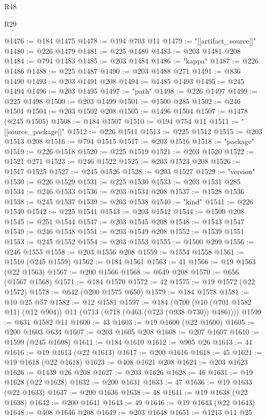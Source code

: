 \begin{lexlean}{R48}
\begin{lexlean}{R29}
\begin{coremodule}
{{{{{{{{{{{{{{{{{{{{{{{{{{{{{{{{{{{{{{{{{{{{{{{{{{{{{{{{{{{{{{{{{{{{{{{{{{{{{{{{{{{{{{{{{{{{{{{{{{{{{{{{{{{{{{{{{{{{{{{{{{{{{{{{{{{{{{{{{{{{{{{{{{{{{{{{{{{{{{{{{{{{{{{{{{{{{{{{{{{{{{{{{{{{{{{{{{{{{{{{{{{{{{{{{{{{{{{{{{@1476 := @184 @1475
@1478 := @194 @703 @11
@1479 := "[[artifact_source]]"
@1480 := @226 @1479
@1481 := @225 @1480
@1483 := @203 @1481 @208
@1484 := @794 @1483
@1485 := @203 @1484
@1486 := "kappa"
@1487 := @226 @1486
@1488 := @225 @1487
@1490 := @203 @1488 @271
@1491 := @836 @1490
@1493 := @203 @1491 @208
@1494 := @1485 @1493
@1495 := @245 @1494
@1496 := @203 @1495
@1497 := "path"
@1498 := @226 @1497
@1499 := @225 @1498
@1500 := @203 @1499
@1501 := @1500 @285
@1502 := @246 @1501
@1504 := @203 @1502 @208
@1505 := @1496 @1504
@1507 := @1478 (@245 @1505)
@1508 := @184 @1507
@1510 := @194 @754 @11
@1511 := "[[source_package]]"
@1512 := @226 @1511
@1513 := @225 @1512
@1515 := @203 @1513 @208
@1516 := @794 @1515
@1517 := @203 @1516
@1518 := "package"
@1519 := @226 @1518
@1520 := @225 @1519
@1521 := @203 @1520
@1522 := @1521 @271
@1523 := @246 @1522
@1525 := @203 @1523 @208
@1526 := @1517 @1525
@1527 := @245 @1526
@1528 := @203 @1527
@1529 := "version"
@1530 := @226 @1529
@1531 := @225 @1530
@1533 := @203 @1531 @285
@1534 := @246 @1533
@1536 := @203 @1534 @208
@1537 := @1528 @1536
@1538 := @245 @1537
@1539 := @203 @1538
@1540 := "kind"
@1541 := @226 @1540
@1542 := @225 @1541
@1543 := @203 @1542
@1544 := @1500 @208
@1545 := @251 @1544
@1547 := @203 @1545 @208
@1548 := @1543 @1547
@1549 := @246 @1548
@1551 := @203 @1549 @208
@1552 := @1539 @1551
@1553 := @245 @1552
@1554 := @203 @1553
@1555 := @1500 @299
@1556 := @246 @1555
@1558 := @203 @1556 @208
@1559 := @1554 @1558
@1561 := @1510 (@245 @1559)
@1562 := @184 @1561
@1563 := 41
@1566 := @19 @1563 (@22 @1563)
@1567 := @200 @1566
@1568 := @649 @208
@1570 := @656 (@1567 @1568)
@1571 := @184 @1570
@1572 := 42
@1575 := @19 @1572 (@22 @1572)
@1578 := @642 (@200 @1575 @650)
@1579 := @184 @1578
@1581 := @10 @25 @57
@1582 := @12 @1581
@1597 := @184
    (@700 (@10 (@701 @1582 @11) (@12 @904)) @11 (@713 (@718 (@463 (@723 (@938 @730)) @486))))
@1599 := @631 @1582 @11
@1600 := 43
@1603 := @19 @1600 (@22 @1600)
@1605 := @200 @1603 @634
@1607 := @203 @1605 @208
@1608 := @207 @1607
@1610 := @1599 (@245 @1608)
@1611 := @184 @1610
@1612 := @905 @26
@1613 := 44
@1616 := @19 @1613 (@22 @1613)
@1617 := @200 @1616
@1618 := 45
@1621 := @19 @1618 (@22 @1618)
@1623 := @408 @1621 @208
@1624 := @203 @1623
@1626 := @1439 @26 @208
@1627 := @203 @1626
@1628 := 46
@1631 := @19 @1628 (@22 @1628)
@1632 := @200 @1631
@1633 := 47
@1636 := @19 @1633 (@22 @1633)
@1637 := @200 @1636
@1638 := 48
@1641 := @19 @1638 (@22 @1638)
@1642 := @200 @1641
@1643 := 49
@1646 := @19 @1643 (@22 @1643)
@1648 := @408 @1646 @208
@1649 := @203 @1648
@1651 := @1213 @11 @25
}}}}}}}}}}}}}}}}}}}}}}}}}}}}}}}}}}}}}}}}}}}}}}}}}}}}}}}}}}}}}}}}}}}}}}}}}}}}}}}}}}}}}}}}}}}}}}}}}}}}}}}}}}}}}}}}}}}}}}}}}}}}}}}}}}}}}}}}}}}}}}}}}}}}}}}}}}}}}}}}}}}}}}}}}}}}}}}}}}}}}}}}}}}}}}}}}}}}}}}}}}}}}}}}}}}}}}}}}}
\end{coremodule}
\end{lexlean}
\end{lexlean}
